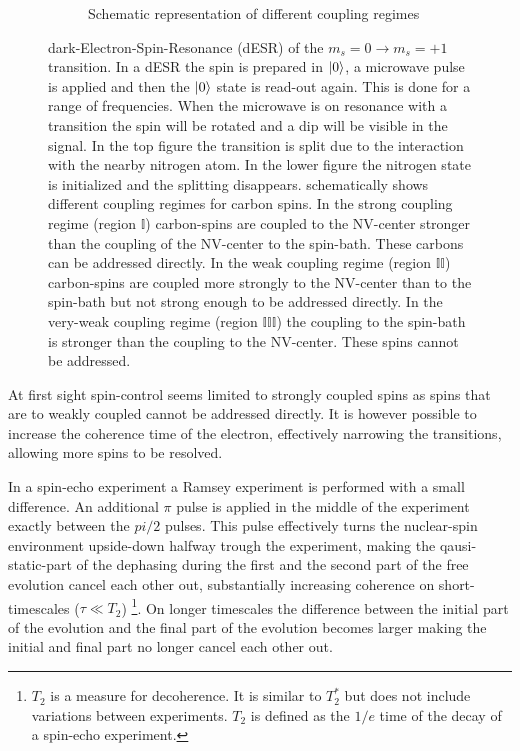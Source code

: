 \begin{figure}[htbp]
\begin{subfigure}[t]{0.49 \textwidth }
        \caption{Schematic representation of different coupling regimes}
        \label{fig:coupling regimes}
    \end{subfigure}
    \caption{ dark-Electron-Spin-Resonance (dESR) of the $m_s =0 \rightarrow m_s = +1$ transition. In a dESR the spin is prepared in ${\left\vert{0}\right\rangle}$, a microwave pulse is applied and then the ${\left\vert{0}\right\rangle}$ state is read-out again. This is done for a range of frequencies. When the microwave is on resonance with a transition the spin will be rotated and a dip will be visible in the signal. In the top figure the transition is split due to the interaction with the nearby nitrogen atom. In the lower figure the nitrogen state is initialized and the splitting disappears.
     schematically shows different coupling regimes for carbon spins. In the strong coupling regime (region $\mathbb{I}$) carbon-spins are coupled to the NV-center stronger than the coupling of the NV-center to the spin-bath. These carbons can be addressed directly. In the weak coupling regime (region $\mathbb{II}$) carbon-spins are coupled more strongly to the NV-center than to the spin-bath but not strong enough to be addressed directly. In the very-weak coupling regime (region $\mathbb{III}$) the coupling to the spin-bath is stronger than the coupling to the NV-center. These spins cannot be addressed.}
\end{figure}

At first sight spin-control seems limited to strongly coupled spins as spins that are to weakly coupled cannot be addressed directly.
It is however possible to increase the coherence time of the electron, effectively narrowing the transitions, allowing more spins to be resolved.

In a spin-echo experiment a Ramsey experiment is performed with a small difference. An additional $\pi$ pulse is applied in the middle of the experiment exactly between the $pi/2$ pulses. This pulse effectively turns the nuclear-spin environment upside-down halfway trough the experiment, making the qausi-static-part of the dephasing during the first and the second part of the free evolution cancel each other out, substantially increasing coherence on short-timescales ($\tau \ll T_2 $)
\footnote{ $T_2$ is a measure for decoherence. It is similar to $T_2^*$ but does not include variations between experiments. $T_2$ is defined as the $1/e$ time of the decay of a spin-echo experiment.}.
On longer timescales the difference between the initial part of the evolution and the final part of the evolution becomes larger making the initial and final part no longer cancel each other out.


